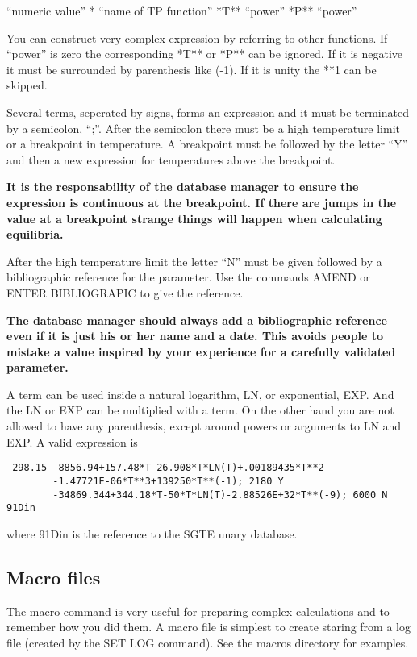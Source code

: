 \documentclass[12pt]{article}
\begin{document}
``numeric value'' * ``name of TP function'' *T** ``power'' *P** ``power'' 

You can construct very complex expression by referring to other
functions.
If ``power'' is zero the corresponding *T** or *P** can be ignored.  If
it is negative it must be surrounded by parenthesis like (-1).  If it
is unity the **1 can be skipped.

Several terms, seperated by signs, forms an expression and it must be
terminated by a semicolon, ``;''.  After the semicolon there must be a
high temperature limit or a breakpoint in temperature.  A breakpoint
must be followed by the letter ``Y'' and then a new expression for
temperatures above the breakpoint.  

{\bf It is the responsability of the database manager to ensure the
  expression is continuous at the breakpoint.  If there are jumps in
  the value at a breakpoint strange things will happen when
  calculating equilibria.}

After the high temperature limit the letter ``N'' must be given
followed by a bibliographic reference for the parameter.  Use the
commands AMEND or ENTER BIBLIOGRAPIC to give the reference.

{\bf The database manager should always add a bibliographic reference
  even if it is just his or her name and a date.  This avoids people
  to mistake a value inspired by your experience for a carefully
  validated parameter.}

A term can be used inside a natural logarithm, LN, or exponential,
EXP. And the LN or EXP can be multiplied with a term.  On the other
hand you are not allowed to have any parenthesis, except around powers
or arguments to LN and EXP.  A valid expression is

\begin{verbatim}
 298.15 -8856.94+157.48*T-26.908*T*LN(T)+.00189435*T**2
        -1.47721E-06*T**3+139250*T**(-1); 2180 Y 
        -34869.344+344.18*T-50*T*LN(T)-2.88526E+32*T**(-9); 6000 N 91Din
\end{verbatim}

where 91Din is the reference to the SGTE unary database.

\subsection{Macro files}

The macro command is very useful for preparing complex calculations
and to remember how you did them.  A macro file is simplest to create
staring from a log file (created by the SET LOG command).  See the
macros directory for examples.
\end{document}
